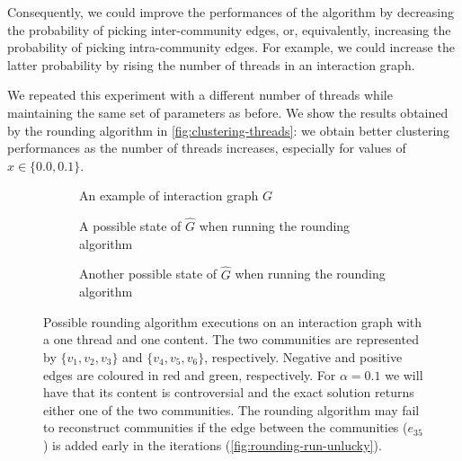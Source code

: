 
Consequently, we could improve the performances of the algorithm by decreasing the probability
of picking inter-community edges, or, equivalently, increasing the probability
of picking intra-community edges. For example, we could increase the latter probability
by rising the number of threads in an interaction graph.

We repeated this experiment with a different number of threads
while maintaining the same set of parameters as before. We show the results
obtained by the rounding algorithm in \autoref{fig:clustering-threads}: we obtain better clustering
performances as the number of threads increases, especially for values of
$x \in \{ 0.0, 0.1 \}$.

\begin{figure}
	\begin{center}
		\begin{subfigure}{0.3\textwidth}
			\centering
			\caption{An example of interaction graph $G$}
			\label{fig:rounding-interaction-graph-example}
		\end{subfigure}
		\quad
		\begin{subfigure}{0.3\textwidth}
			\centering
			\caption{A possible state of $\hat{G}$ when running the rounding
				algorithm}
			\label{fig:rounding-run-unlucky}
		\end{subfigure}
		\quad
		\begin{subfigure}{0.3\textwidth}
			\centering
			\caption{Another possible state of $\hat{G}$ when running the
				rounding algorithm}
			\label{fig:rounding-run-lucky}
		\end{subfigure}
	\end{center}
	\caption[An interaction graph with a single thread and content and two
		possible iterations of the rounding algorithm]{Possible rounding algorithm
		executions on an interaction graph with a
		one thread and one content. The two communities are represented by $\{ v_1, v_2,
			v_3\}$ and $\{ v_4, v_5, v_6\}$, respectively. Negative and
		positive edges are coloured in red and green, respectively.
		For $\alpha = 0.1$ we will have that its content is
		controversial and the exact solution returns either one of
		the two communities. The rounding algorithm may fail to reconstruct
		communities if the edge between the communities ($e_{35}$) is added early in
		the iterations (\autoref{fig:rounding-run-unlucky}).}
	\label{fig:rounding-example}
\end{figure}

